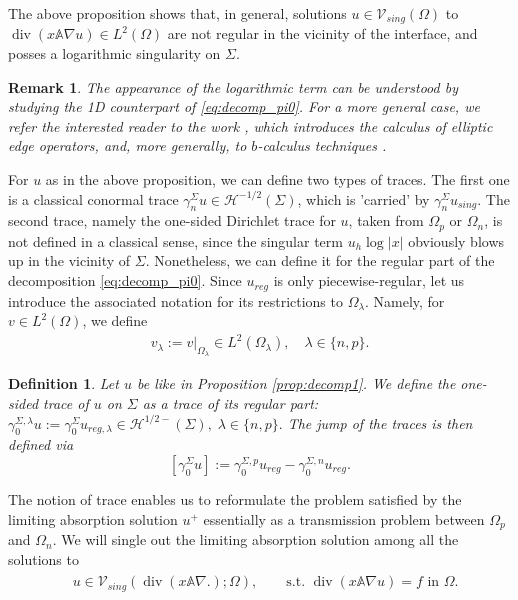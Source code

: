 \documentclass[report]{elsarticle}
\newtheorem{definition}[theorem]{Definition}
\newtheorem{remark}[theorem]{Remark}
\numberwithin{theorem}{section}
\begin{document}
The above proposition shows that, in general, solutions $u\in\mathcal{V}_{sing}(\Omega)$ to $\operatorname{div}(x\mathbb{A}\nabla u)\in L^2(\Omega)$ are not regular in the vicinity of the interface, and posses a logarithmic singularity on $\Sigma$. 
\begin{remark}
	The appearance of the logarithmic term can be understood by studying the 1D counterpart of \eqref{eq:decomp_pi0}. For a more general case, we refer the  interested reader to the work \cite{mazzeo}, which introduces the calculus of elliptic edge operators, and, more generally, to  $b$-calculus techniques \cite{melrose, grieser}. 
\end{remark} 
For $u$ as in the above proposition, we can define two types of traces. The first one is a classical conormal trace $\gamma_n^{\Sigma}u\in \mathcal{H}^{-1/2}(\Sigma)$, which is 'carried' by $\gamma_n^{\Sigma}u_{sing}$. The second trace, namely the one-sided Dirichlet trace for $u$, taken from $\Omega_p$ or $\Omega_n$, is not defined in a classical sense, since the singular term $u_h\log|x|$ obviously blows up in the vicinity of $\Sigma$. Nonetheless, we can define it for the regular part of the decomposition \eqref{eq:decomp_pi0}. Since $u_{reg}$ is only piecewise-regular, let us introduce the associated notation for its restrictions to $\Omega_{\lambda}$. Namely, for $v\in L^2(\Omega)$, we define 
\begin{align*}
	v_{\lambda}:=\left. v\right|_{\Omega_{\lambda}}\in L^2(\Omega_{\lambda}), \quad \lambda\in \{n,p\}.
\end{align*}
\begin{definition}
	\label{definition:one_sided_trace}
	Let $u$ be like in Proposition \ref{prop:decomp1}. We define the one-sided trace of $u$ on $\Sigma$ as a trace of its regular part: $
	\gamma_{0}^{\Sigma,\lambda}u:=\gamma_0^{\Sigma}u_{reg,\lambda}\in \mathcal{H}^{1/2-}(\Sigma), \; \lambda\in \{n,p\}.$ The jump of the traces is then defined via 
	$$
	[\gamma_{0}^{\Sigma}u]:=\gamma_0^{\Sigma,p}u_{reg}-\gamma_0^{\Sigma,n}u_{reg}.$$
\end{definition}
The notion of trace enables us to reformulate the problem satisfied by the limiting absorption solution $u^+$ essentially as a transmission problem between $\Omega_p$ and $\Omega_n$. We will single out the limiting absorption solution among all the solutions to
\begin{align}
	\label{eq:pb1}
	\begin{split}
		&u\in \mathcal{V}_{sing}(\operatorname{div}(x\mathbb{A}\nabla .); \Omega),\qquad \text{s.t. }\operatorname{div}(x\mathbb{A}\nabla u)=f \text{ in }\Omega.
	\end{split}
\end{align}
\end{document}
